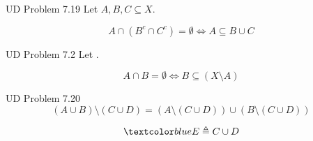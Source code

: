 \begin{frame}
  \begin{exampleblock}{UD Problem 7.19}
    Let $A, B, C \subseteq X$.

    \[
      A \cap (B^{c} \cap C^{c}) = \emptyset \iff A \subseteq B \cup C
    \]
  \end{exampleblock}

  \pause
  \vspace{0.60cm}
  \begin{exampleblock}{UD Problem 7.2}
    Let .

    \[
      A \cap B = \emptyset \iff B \subseteq (X \setminus A)
    \]
  \end{exampleblock}
\end{frame}

\begin{frame}
  \begin{exampleblock}{UD Problem 7.20}
    \[
      (A \cup B) \setminus (C \cup D) = (A \setminus (C \cup D)) \cup (B \setminus (C \cup D))
    \]
  \end{exampleblock}

  \pause
  \[
    \blue{E \triangleq C \cup D}
  \]
\end{frame}
